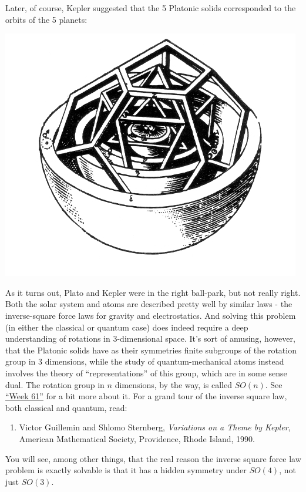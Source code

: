 \documentclass{article}
\def\tightlist{}
\begin{document}
Later, of course, Kepler suggested that the 5 Platonic solids
corresponded to the orbits of the 5 planets:

\includegraphics{../images/kepler_mysterium_cosmographicum.jpg}

As it turns out, Plato and Kepler were in the right ball-park, but not
really right. Both the solar system and atoms are described pretty well
by similar laws - the inverse-square force laws for gravity and
electrostatics. And solving this problem (in either the classical or
quantum case) does indeed require a deep understanding of rotations in
3-dimensional space. It's sort of amusing, however, that the Platonic
solids have as their symmetries finite subgroups of the rotation group
in 3 dimensions, while the study of quantum-mechanical atoms instead
involves the theory of ``representations'' of this group, which are in
some sense dual. The rotation group in \(n\) dimensions, by the way, is
called \(SO(n)\). See \protect\hyperlink{week61}{``Week 61''} for a bit
more about it. For a grand tour of the inverse square law, both
classical and quantum, read:

\begin{enumerate}
\def\labelenumi{\arabic{enumi})}
\tightlist
\item
  Victor Guillemin and Shlomo Sternberg, \emph{Variations on a Theme by
  Kepler}, American Mathematical Society, Providence, Rhode Island,
  1990.
\end{enumerate}

You will see, among other things, that the real reason the inverse
square force law problem is exactly solvable is that it has a hidden
symmetry under \(SO(4)\), not just \(SO(3)\).
\end{document}
